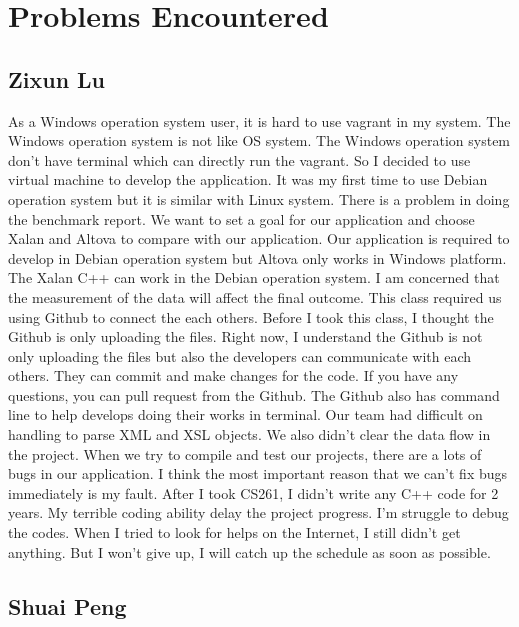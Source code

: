 \section{Problems Encountered}

\subsection{Zixun Lu}

As a Windows operation system user, it is hard to use vagrant in my system.
The Windows operation system is not like OS system. 
The Windows operation system don't have terminal which can directly run the vagrant. 
So I decided to use virtual machine to develop the application.
It was my first time to use Debian operation system but it is similar with Linux system. 
There is a problem in doing the benchmark report. 
We want to set a goal for our application and choose Xalan and Altova to compare with our application. 
Our application is required to develop in Debian operation system but Altova only works in Windows platform. 
The Xalan C++ can work in the Debian operation system. 
I am concerned that the measurement of the data will affect the final outcome. 
This class required us using Github to connect the each others.
Before I took this class, I thought the Github is only uploading the files.
Right now, I understand the Github is not only uploading the files but also the developers can communicate with each others. 
They can commit and make changes for the code. 
If you have any questions, you can pull request from the Github. 
The Github also has command line to help develops doing their works in terminal. 
Our team had difficult on handling to parse XML and XSL objects.
We also didn’t clear the data flow in the project. 
When we try to compile and test our projects, there are a lots of bugs in our application. 
I think the most important reason that we can’t fix bugs immediately is my fault. After I took CS261, I didn’t write any C++ code for 2 years. My terrible coding ability delay the project progress. 
I’m struggle to debug the codes. 
When I tried to look for helps on the Internet, I still didn’t get anything.
But I won't give up, I will catch up the schedule as soon as possible.  

\subsection{Shuai Peng}

